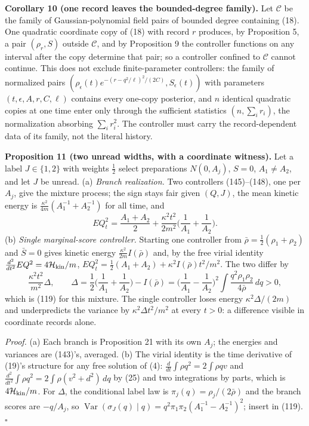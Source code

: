 \documentclass[11pt,a4paper]{article}
\begin{document}
\textbf{Corollary 10 (one record leaves the bounded-degree family).} Let
\(\mathcal C\) be the family of Gaussian-polynomial field pairs of
bounded degree containing (18). One quadratic coordinate copy of (18)
with record \(r\) produces, by Proposition 5, a pair \((\rho_r,S)\)
outside \(\mathcal C\), and by Proposition 9 the controller functions on
any interval after the copy determine that pair; so a controller
confined to \(\mathcal C\) cannot continue. This does not exclude
finite-parameter controllers: the family of normalized pairs
\((\rho_\epsilon(t)e^{-(r-q^2/\ell)^2/(2C)},S_\epsilon(t))\) with
parameters \((t,\epsilon,A,r,C,\ell)\) contains every one-copy
posterior, and \(n\) identical quadratic copies at one time enter only
through the sufficient statistics \((n,\sum_ir_i)\), the normalization
absorbing \(\sum_ir_i^2\). The controller must carry the
record-dependent data of its family, not the literal history.

\textbf{Proposition 11 (two unread widths, with a coordinate witness).}
Let a label \(J\in\{1,2\}\) with weights \(\tfrac12\) select
preparations \(N(0,A_j)\), \(S=0\), \(A_1\neq A_2\), and let \(J\) be
unread. (a) \emph{Branch realization.} Two controllers (145)--(148), one
per \(A_j\), give the mixture process; the sign stays fair given
\((Q,J)\), the mean kinetic energy is
\(\tfrac{\kappa^2}{4m}(A_1^{-1}+A_2^{-1})\) for all time, and
\[EQ_t^2=\frac{A_1+A_2}2+\frac{\kappa^2t^2}{2m^2}
 \Big(\frac1{A_1}+\frac1{A_2}\Big).\tag{31}\] (b) \emph{Single
marginal-score controller.} Starting one controller from
\(\bar\rho=\tfrac12(\rho_1+\rho_2)\) and \(\bar S=0\) gives kinetic
energy \(\tfrac{\kappa^2}{2m}I(\bar\rho)\) and, by the free virial
identity \(\tfrac{d^2}{dt^2}EQ^2=4\mathcal H_{\rm kin}/m\),
\(EQ_t^2=\tfrac12(A_1+A_2)+\kappa^2I(\bar\rho)t^2/m^2\). The two differ
by \[\frac{\kappa^2t^2}{m^2}\Delta,\qquad
\Delta=\frac12\Big(\frac1{A_1}+\frac1{A_2}\Big)-I(\bar\rho)
=\Big(\frac1{A_1}-\frac1{A_2}\Big)^2\int\frac{q^2\rho_1\rho_2}{4\bar\rho}\,dq>0,\tag{32}\]
which is (119) for this mixture. The single controller loses energy
\(\kappa^2\Delta/(2m)\) and underpredicts the variance by
\(\kappa^2\Delta t^2/m^2\) at every \(t>0\): a difference visible in
coordinate records alone.

\emph{Proof.} (a) Each branch is Proposition 21 with its own \(A_j\);
the energies and variances are (143)'s, averaged. (b) The virial
identity is the time derivative of (19)'s structure for any free
solution of (4): \(\tfrac{d}{dt}\int\rho q^2=2\int\rho qv\) and
\(\tfrac{d^2}{dt^2}\int\rho q^2=2\int\rho(v^2+d^2)\,dq\) by (25) and two
integrations by parts, which is \(4\mathcal H_{\rm kin}/m\). For
\(\Delta\), the conditional label law is \(\pi_j(q)=\rho_j/(2\bar\rho)\)
and the branch scores are \(-q/A_j\), so
\(\operatorname{Var}(\sigma_J(q)\mid q)=q^2\pi_1\pi_2(A_1^{-1}-A_2^{-1})^2\);
insert in (119). \(\square\)
\end{document}
